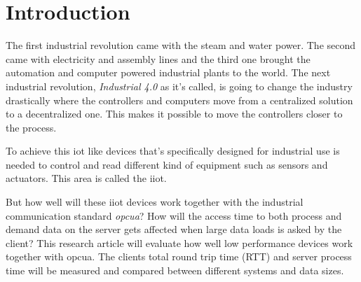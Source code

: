 \section{Introduction} \label{introduction}
The first industrial revolution came with the steam and water power.
The second came with electricity and assembly lines and the third one brought the automation and computer powered industrial plants to the world.
The next industrial revolution, \textit{Industrial 4.0} as it's called, is going to change the industry drastically where the controllers and computers move from a centralized solution to a decentralized one. This makes it possible to move the controllers closer to the process. \cite{industryFourDesign}

\bigskip

To achieve this \acrfull{iot} like devices that's specifically designed for industrial use is needed to control and read different kind of equipment such as sensors and actuators. This area is called the \acrfull{iiot}. 

\bigskip

But how well will these \acrshort{iiot} devices work together with the industrial communication standard \textit{\acrfull{opcua}}? How will the access time to both process and demand data on the server gets affected when large data loads is asked by the client? This research article will evaluate how well low performance devices work together with \acrshort{opcua}. The clients total round trip time (RTT) and server process time will be measured and compared between different systems and data sizes.
